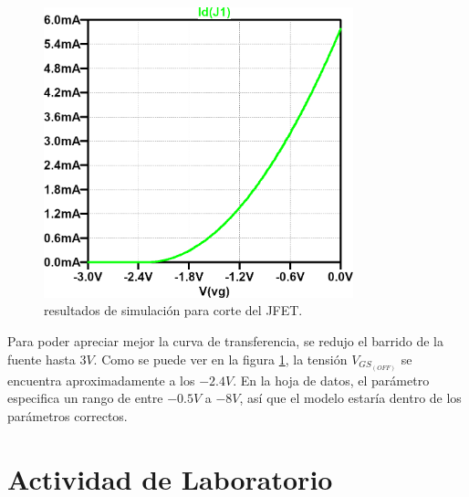     \begin{figure}[!ht]
      \centering
      \includegraphics[width=0.8\textwidth]{images/corte-id_vgs.png}
      \caption{resultados de simulación para corte del JFET.}
      \label{fig:sim.corte}
    \end{figure}

    Para poder apreciar mejor la curva de transferencia, se redujo el barrido de la fuente hasta $3V$. Como se puede ver
    en la figura \ref{fig:sim.corte}, la tensión $V_{GS_{(OFF)}}$ se encuentra aproximadamente a los $-2.4V$. En la hoja
    de datos, el parámetro especifica un rango de entre $-0.5V$ a $-8V$, así que el modelo estaría dentro de los
    parámetros correctos.

  \section{Actividad de Laboratorio}
